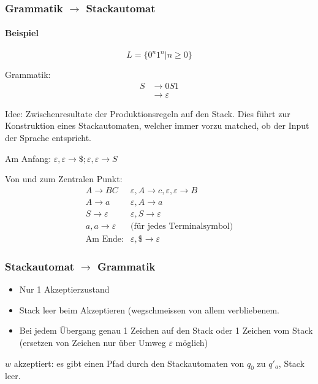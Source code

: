 \subsubsection{Grammatik $\rightarrow$ Stackautomat}

\paragraph{Beispiel}

\[
L = \{ 0^n 1^n | n \geq 0 \}
\]

Grammatik:
\begin{align*}
S &\rightarrow 0S1 \\
  &\rightarrow \varepsilon
\end{align*}

Idee: Zwischenresultate der Produktionsregeln auf den Stack. Dies führt zur Konstruktion eines Stackautomaten, welcher immer vorzu matched, ob der Input der Sprache entspricht.



Am Anfang: $\varepsilon, \varepsilon \to \$; \varepsilon, \varepsilon \to S$


Von und zum Zentralen Punkt: 
\begin{align*}
A \to BC & \varepsilon, A \to c, \varepsilon, \varepsilon \to B \\
A \to a & \varepsilon, A \to a \\
S \to \varepsilon & \varepsilon, S \to \varepsilon \\
a, a \to \varepsilon & \text{(für jedes Terminalsymbol)} \\
\text{Am Ende:} & \varepsilon, \$ \to \varepsilon 
\end{align*}

\subsubsection{Stackautomat $\to$ Grammatik}

\begin{itemize}
	 \item Nur 1 Akzeptierzustand
	 \item Stack leer beim Akzeptieren (wegschmeissen von allem verbliebenem.
	 \item Bei jedem Übergang genau 1 Zeichen auf den Stack oder 1 Zeichen vom Stack (ersetzen von Zeichen nur über Umweg $\varepsilon$ möglich)
\end{itemize}

$w$ akzeptiert: es gibt einen Pfad durch den Stackautomaten von $q_0$ zu $q'_a$, Stack leer.

